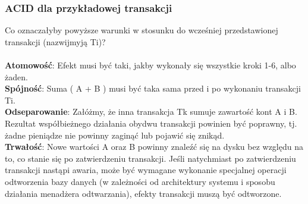 \documentclass[12pt]{article}
\begin{document}
    \subsubsection{ACID dla przykładowej transakcji}
    Co oznaczałyby powyższe warunki w stosunku do wcześniej przedstawionej transakcji (nazwijmyją Ti)?
    \\\\
    \textbf{Atomowość}: Efekt musi być taki, jakby wykonały się wszystkie kroki 1-6, albo żaden.\\
    \textbf{Spójność}: Suma ( A + B ) musi być taka sama przed i po wykonaniu transakcji Ti.\\
    \textbf{Odseparowanie}: Załóżmy, że inna transakcja Tk sumuje zawartość kont A i B. Rezultat
    współbieżnego działania obydwu transakcji powinien być poprawny, tj. żadne
    pieniądze nie powinny zaginąć lub pojawić się znikąd.\\
    \textbf{Trwałość}: Nowe wartości A oraz B powinny znaleźć się na dysku bez względu na to, co
    stanie się po zatwierdzeniu transakcji. Jeśli natychmiast po zatwierdzeniu
    transakcji nastąpi awaria, może być wymagane wykonanie specjalnej operacji
    odtworzenia bazy danych (w zależności od architektury systemu i sposobu
    działania menadżera odtwarzania), efekty transakcji muszą być odtworzone.\\
    
\end{document}
